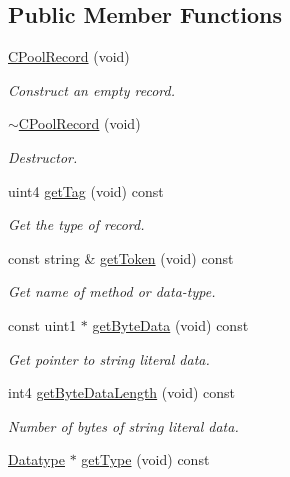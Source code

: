 \subsection*{Public Member Functions}
\begin{DoxyCompactItemize}
\item 
\mbox{\hyperlink{class_c_pool_record_abe6be8618430888ed3ee2ae45a73fc21}{C\+Pool\+Record}} (void)
\begin{DoxyCompactList}\small\item\em Construct an empty record. \end{DoxyCompactList}\item 
\mbox{\hyperlink{class_c_pool_record_a6168bb58c23b8d8936c5133ce322b6ae}{$\sim$\+C\+Pool\+Record}} (void)
\begin{DoxyCompactList}\small\item\em Destructor. \end{DoxyCompactList}\item 
uint4 \mbox{\hyperlink{class_c_pool_record_ad446b1f55deb567ad7e9671512dc1c94}{get\+Tag}} (void) const
\begin{DoxyCompactList}\small\item\em Get the type of record. \end{DoxyCompactList}\item 
const string \& \mbox{\hyperlink{class_c_pool_record_a7b76b5b4547e4cedc60b79e635fda432}{get\+Token}} (void) const
\begin{DoxyCompactList}\small\item\em Get name of method or data-\/type. \end{DoxyCompactList}\item 
const uint1 $\ast$ \mbox{\hyperlink{class_c_pool_record_af0ba95f04fca02b928729e8fefe18096}{get\+Byte\+Data}} (void) const
\begin{DoxyCompactList}\small\item\em Get pointer to string literal data. \end{DoxyCompactList}\item 
int4 \mbox{\hyperlink{class_c_pool_record_a9f4149e7836173ae8658d6c5d820c13e}{get\+Byte\+Data\+Length}} (void) const
\begin{DoxyCompactList}\small\item\em Number of bytes of string literal data. \end{DoxyCompactList}\item 
\mbox{\hyperlink{class_datatype}{Datatype}} $\ast$ \mbox{\hyperlink{class_c_pool_record_ad6af01c246cf40ac83fb54fe7df981dd}{get\+Type}} (void) const

\end{DoxyCompactItemize}
